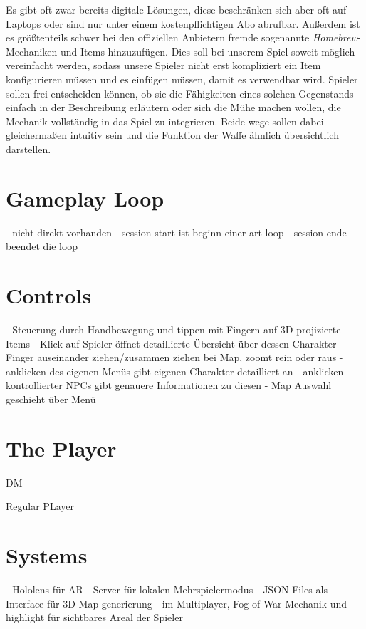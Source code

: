 \documentclass[11pt]{article}
\begin{document}
    Es gibt oft zwar bereits digitale Lösungen, diese beschränken sich aber oft auf Laptops
    oder sind nur unter einem kostenpflichtigen Abo abrufbar.
    Außerdem ist es größtenteils schwer bei den offiziellen Anbietern fremde sogenannte \textit{Homebrew}-Mechaniken
    und Items hinzuzufügen.
    Dies soll bei unserem Spiel soweit möglich vereinfacht werden, sodass unsere Spieler nicht erst kompliziert
    ein Item konfigurieren müssen und es einfügen müssen, damit es verwendbar wird.
    Spieler sollen frei entscheiden können, ob sie die Fähigkeiten eines solchen Gegenstands einfach
    in der Beschreibung erläutern oder sich die Mühe machen wollen, die Mechanik vollständig in das
    Spiel zu integrieren.
    Beide wege sollen dabei gleichermaßen intuitiv sein und die Funktion der Waffe ähnlich
    übersichtlich darstellen.



    \section{Gameplay Loop}
    - nicht direkt vorhanden
    - session start ist beginn einer art loop
    - session ende beendet die loop

    \section{Controls}
    - Steuerung durch Handbewegung und tippen mit Fingern auf 3D projizierte Items
    - Klick auf Spieler öffnet detaillierte Übersicht über dessen Charakter
    - Finger auseinander ziehen/zusammen ziehen bei Map, zoomt rein oder raus
    - anklicken des eigenen Menüs gibt eigenen Charakter detailliert an
    - anklicken kontrollierter NPCs gibt genauere Informationen zu diesen
    - Map Auswahl geschieht über Menü

    \section{The Player}
    DM


    Regular PLayer


    \section{Systems}
    - Hololens für AR
    - Server für lokalen Mehrspielermodus
    - JSON Files als Interface für 3D Map generierung
    - im Multiplayer, Fog of War Mechanik und highlight für sichtbares Areal der Spieler
\end{document}
